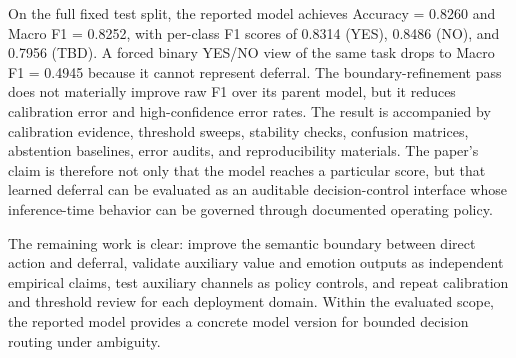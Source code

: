 \documentclass[11pt]{article}
\begin{document}
On the full fixed test split, the reported model achieves Accuracy = 0.8260 and Macro F1 = 0.8252, with per-class F1 scores of 0.8314 (YES), 0.8486 (NO), and 0.7956 (TBD). A forced binary YES/NO view of the same task drops to Macro F1 = 0.4945 because it cannot represent deferral. The boundary-refinement pass does not materially improve raw F1 over its parent model, but it reduces calibration error and high-confidence error rates. The result is accompanied by calibration evidence, threshold sweeps, stability checks, confusion matrices, abstention baselines, error audits, and reproducibility materials. The paper's claim is therefore not only that the model reaches a particular score, but that learned deferral can be evaluated as an auditable decision-control interface whose inference-time behavior can be governed through documented operating policy.

The remaining work is clear: improve the semantic boundary between direct action and deferral, validate auxiliary value and emotion outputs as independent empirical claims, test auxiliary channels as policy controls, and repeat calibration and threshold review for each deployment domain. Within the evaluated scope, the reported model provides a concrete model version for bounded decision routing under ambiguity.



\end{document}
